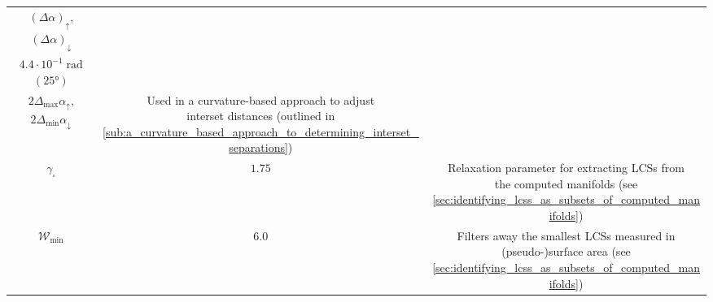 \begin{table}[htpb]
\begin{tabular}{ccc}
{        ${(\Delta\alpha)}_{\uparrow}$, ${(\Delta\alpha)}_{\downarrow}$} &
        \makecell[c]{$8.7\cdot10^{-2}\;\si{\radian}$ \phantom{2}$({5}\si{\degree})$\\ %
            ${4.4\cdot10^{-1}}\;\si{\radian}$ $({25}\si{\degree})$\\[1.5pt]%
        $2\Delta_{\max}\alpha_{\uparrow}$, $2\Delta_{\min}\alpha_{\downarrow}$}%
        & \makecell[c]{Used in a curvature-based approach to adjust\\
        interset distances (outlined in
        \cref{sub:a_curvature_based_approach_to_determining_interset_separations})}
        \\[18pt]
        $\gamma_{\square}$ &
        $1.75$ &
        \makecell[c]{Relaxation parameter for extracting LCSs from\\ the
            computed manifolds (see
        \cref{sec:identifying_lcss_as_subsets_of_computed_manifolds})}
        \\[9pt]
        $\mathcal{W}_{\text{min}}$ &
        $6.0$ &
        \makecell[c]{Filters away the smallest LCSs measured in\\
        (pseudo-)surface area (see
        \cref{sec:identifying_lcss_as_subsets_of_computed_manifolds})}
        \\
        \bottomrule
    \end{tabular}
\end{table}

